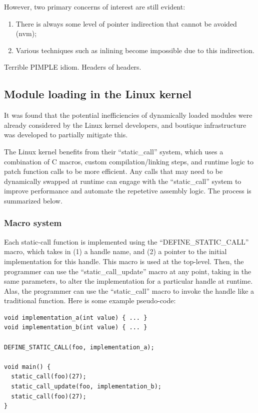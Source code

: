 \documentclass[12pt,a4paper,twoside]{report}
\begin{document}
However, two primary concerns of interest are still evident:

\begin{enumerate}
  \item There is always some level of pointer indirection that cannot be avoided (nvm);
  \item Various techniques such as inlining become impossible due to this indirection.
\end{enumerate}

Terrible PIMPLE idiom. Headers of headers.

\subsection{Module loading in the Linux kernel}

It was found that the potential inefficiencies of dynamically loaded modules were already considered by the Linux kernel developers, and boutique infrastructure was developed to partially mitigate this.

The Linux kernel benefits from their ``static\_call'' system, which uses a combination of C macros, custom compilation/linking steps, and runtime logic to patch function calls to be more efficient. Any calls that may need to be dynamically swapped at runtime can engage with the ``static\_call'' system to improve performance and automate the repetetive assembly logic. The process is summarized below.

\subsubsection{Macro system}

Each static-call function is implemented using the ``DEFINE\_STATIC\_CALL'' macro, which takes in (1) a handle name, and (2) a pointer to the initial implementation for this handle. This macro is used at the top-level. Then, the programmer can use the ``static\_call\_update'' macro at any point, taking in the same parameters, to alter the implementation for a particular handle at runtime. Alas, the programmer can use the ``static\_call'' macro to invoke the handle like a traditional function. Here is some example pseudo-code:

\begin{verbatim}
void implementation_a(int value) { ... }
void implementation_b(int value) { ... }

DEFINE_STATIC_CALL(foo, implementation_a);

void main() {
  static_call(foo)(27);
  static_call_update(foo, implementation_b);
  static_call(foo)(27);
}
\end{verbatim}
\end{document}
